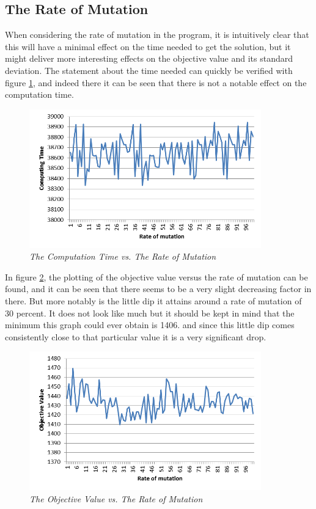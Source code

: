 \subsection{The Rate of Mutation}
When considering the rate of mutation in the program, it is intuitively clear that this will have a minimal effect on the time needed to get the solution, but it might deliver more interesting effects on the objective value and its standard deviation.
The statement about the time needed can quickly be verified with figure \ref{CTRM}, and indeed there it can be seen that there is not a notable effect on the computation time.

\begin{figure}[h] 
	\centering
	\includegraphics[height=6cm]{CTRM}
	\caption{\textsl{The Computation Time vs. The Rate of Mutation}}
	\label{CTRM}
\end{figure}


\par
In figure \ref{OVRM}, the plotting of the objective value versus the rate of mutation can be found, and it can be seen that there seems to be a very slight decreasing factor in there. But more notably is the little dip it attains around a rate of mutation of 30 percent. It does not look like much but it should be kept in mind that the minimum this graph could ever obtain is 1406. and since this little dip comes consistently close to that particular value it is a very significant drop.

\begin{figure}[h] 
	\centering
	\includegraphics[height=6cm]{OVRM}
	\caption{\textsl{The Objective Value vs. The Rate of Mutation}}
	\label{OVRM}
\end{figure}

